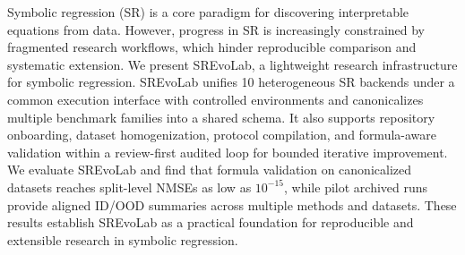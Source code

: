 

Symbolic regression (SR) is a core paradigm for discovering interpretable equations from data. However, progress in SR is increasingly constrained by fragmented research workflows, which hinder reproducible comparison and systematic extension. We present SREvoLab, a lightweight research infrastructure for symbolic regression. SREvoLab unifies 10 heterogeneous SR backends under a common execution interface with controlled environments and canonicalizes multiple benchmark families into a shared schema. It also supports repository onboarding, dataset homogenization, protocol compilation, and formula-aware validation within a review-first audited loop for bounded iterative improvement. We evaluate SREvoLab and find that formula validation on canonicalized datasets reaches split-level NMSEs as low as $10^{-15}$, while pilot archived runs provide aligned ID/OOD summaries across multiple methods and datasets. These results establish SREvoLab as a practical foundation for reproducible and extensible research in symbolic regression.